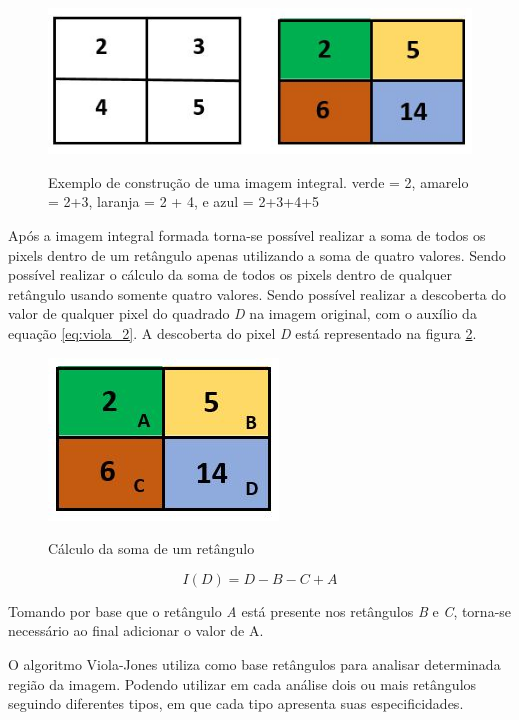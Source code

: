 \begin{figure}[H]
\centering
\caption{Exemplo de construção de uma imagem integral. verde = 2, amarelo = 2+3, laranja = 2 + 4, e azul = 2+3+4+5}
\includegraphics[scale = 0.90]{imgs/viola.png}
\label{fig:viola8}
\end{figure}


Após a imagem integral formada torna-se possível realizar a soma de todos os pixels dentro de um retângulo apenas utilizando a soma de quatro valores. Sendo possível realizar o cálculo da soma de todos os pixels dentro de qualquer retângulo usando somente quatro valores. Sendo possível realizar a descoberta do valor de qualquer pixel do quadrado \textit{D} na imagem original, com o auxílio da equação \ref{eq:viola_2}. A descoberta do pixel \textit{D} está representado na figura \ref{fig:violaret}.


\begin{figure}[H]
\centering
\caption{Cálculo da soma de um retângulo}
\includegraphics[scale = 0.90]{imgs/viola2.png}
\label{fig:violaret}
\end{figure}

\begin{equation}
\label{eq:viola_2}
I(D) = D - B - C + A
\end{equation}

Tomando por base que o retângulo \textit{A} está presente nos retângulos \textit{B} e \textit{C}, torna-se necessário ao final adicionar o valor de A.

O algoritmo Viola-Jones utiliza como base retângulos para analisar determinada região da imagem. Podendo utilizar em cada análise dois ou mais retângulos seguindo diferentes tipos, em que cada tipo apresenta suas especificidades.

